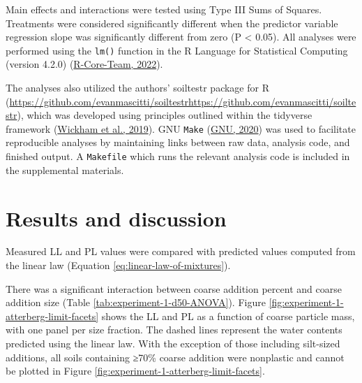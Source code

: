 \documentclass[
  letterpaper,
]{article}
\begin{document}
Main effects and interactions were tested using Type III Sums of Squares.
Treatments were considered significantly different when the predictor variable regression slope was significantly different from zero (P \textless{} 0.05).
All analyses were performed using the \texttt{lm()} function in the R Language for Statistical Computing (version 4.2.0) (\protect\hyperlink{ref-R-Core-Team2022}{R-Core-Team, 2022}).

The analyses also utilized the authors' soiltestr package for R (\url{https://github.com/evanmascitti/soiltestrhttps://github.com/evanmascitti/soiltestr}), which was developed using principles outlined within the tidyverse framework (\protect\hyperlink{ref-Wickham2019a}{Wickham et al., 2019}).
GNU \texttt{Make} (\protect\hyperlink{ref-GNU2020}{GNU, 2020}) was used to facilitate reproducible analyses by maintaining links between raw data, analysis code, and finished output.
A \texttt{Makefile} which runs the relevant analysis code is included in the supplemental materials.

\clearpage

\hypertarget{results-and-discussion}{%
\section{Results and discussion}\label{results-and-discussion}}

Measured LL and PL values were compared with predicted values computed from the linear law (Equation \eqref{eq:linear-law-of-mixtures}).

There was a significant interaction between coarse addition percent and coarse addition size (Table \ref{tab:experiment-1-d50-ANOVA}).
Figure \ref{fig:experiment-1-atterberg-limit-facets} shows the LL and PL as a
function of coarse particle mass, with one panel per size fraction.
The dashed lines represent the water contents predicted using the linear law.
With the exception of those including silt-sized additions, all soils containing ≥70\% coarse addition were nonplastic and cannot be plotted in Figure \ref{fig:experiment-1-atterberg-limit-facets}.
\end{document}
